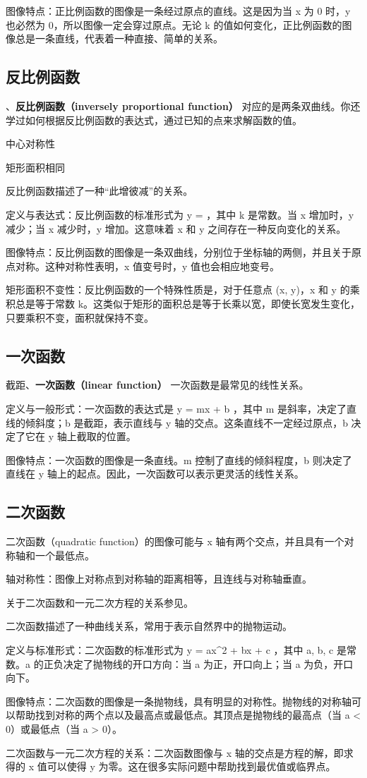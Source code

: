 图像特点：正比例函数的图像是一条经过原点的直线。这是因为当 x 为 0 时，y 也必然为 0，所以图像一定会穿过原点。无论 k 的值如何变化，正比例函数的图像总是一条直线，代表着一种直接、简单的关系。

\subsection{反比例函数}

、\textbf{反比例函数（inversely proportional function）}
对应的是两条双曲线。你还学过如何根据反比例函数的表达式，通过已知的点来求解函数的值。

中心对称性

矩形面积相同

反比例函数描述了一种“此增彼减”的关系。

定义与表达式：反比例函数的标准形式为  y =  ，其中 k 是常数。当 x 增加时，y 减少；当 x 减少时，y 增加。这意味着 x 和 y 之间存在一种反向变化的关系。

图像特点：反比例函数的图像是一条双曲线，分别位于坐标轴的两侧，并且关于原点对称。这种对称性表明，x 值变号时，y 值也会相应地变号。

矩形面积不变性：反比例函数的一个特殊性质是，对于任意点 (x, y)，x 和 y 的乘积总是等于常数 k。这类似于矩形的面积总是等于长乘以宽，即使长宽发生变化，只要乘积不变，面积就保持不变。

\subsection{一次函数}

截距、\textbf{一次函数（linear function）}
一次函数是最常见的线性关系。

定义与一般形式：一次函数的表达式是  y = mx + b ，其中 m 是斜率，决定了直线的倾斜度；b 是截距，表示直线与 y 轴的交点。这条直线不一定经过原点，b 决定了它在 y 轴上截取的位置。

图像特点：一次函数的图像是一条直线。m 控制了直线的倾斜程度，b 则决定了直线在 y 轴上的起点。因此，一次函数可以表示更灵活的线性关系。

\subsection{二次函数}

二次函数（quadratic function）的图像可能与  x  轴有两个交点，并且具有一个对称轴和一个最低点。

轴对称性：图像上对称点到对称轴的距离相等，且连线与对称轴垂直。

关于二次函数和一元二次方程的关系参见。

二次函数描述了一种曲线关系，常用于表示自然界中的抛物运动。

定义与标准形式：二次函数的标准形式为  y = ax^2 + bx + c ，其中 a, b, c 是常数。a 的正负决定了抛物线的开口方向：当 a 为正，开口向上；当 a 为负，开口向下。

图像特点：二次函数的图像是一条抛物线，具有明显的对称性。抛物线的对称轴可以帮助找到对称的两个点以及最高点或最低点。其顶点是抛物线的最高点（当 a < 0）或最低点（当 a > 0）。

二次函数与一元二次方程的关系：二次函数图像与 x 轴的交点是方程的解，即求得的 x 值可以使得 y 为零。这在很多实际问题中帮助找到最优值或临界点。
